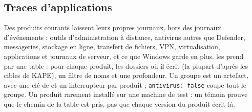 \documentclass[11pt,a4paper,oneside]{report}
\begin{document}
\subsection{Traces d'applications}\label{sec:traces}

Des produits courants laissent leurs propres journaux, hors des journaux
d'événements : outils d'administration à distance, antivirus autres que
Defender, messageries, stockage en ligne, transfert de fichiers, VPN,
virtualisation, applications et journaux de serveur, et ce que Windows garde
en plus. \wac{} les prend par une table : pour chaque produit, les dossiers
où il écrit (la plupart d'après les cibles de KAPE), un filtre de noms et une
profondeur. Un groupe est un artefact, avec une clé de  et un
interrupteur par produit ; \texttt{antivirus: false} coupe tout le groupe. Un
produit rarement installé sur une machine de test : un témoin prouve que le
chemin de la table est pris, pas que chaque version du produit écrit là.
\end{document}
